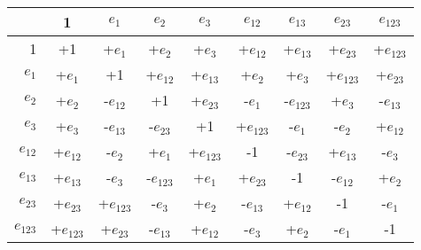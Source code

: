 
\begin{tabular}{|r||c|c|c|c|c|c|c|c|}
\hline
 &
1 & $e_{1}$ & $e_{2}$ & $e_{3}$ & $e_{12}$ & $e_{13}$ & $e_{23}$ & $e_{123}$\\
\hline
\hline
1 & +1 & +$e_{1}$ & +$e_{2}$ & +$e_{3}$ & +$e_{12}$ & +$e_{13}$ & +$e_{23}$ & +$e_{123}$\\
\hline
$e_{1}$ & +$e_{1}$ & +1 & +$e_{12}$ & +$e_{13}$ & +$e_{2}$ & +$e_{3}$ & +$e_{123}$ & +$e_{23}$\\
\hline
$e_{2}$ & +$e_{2}$ & -$e_{12}$ & +1 & +$e_{23}$ & -$e_{1}$ & -$e_{123}$ & +$e_{3}$ & -$e_{13}$\\
\hline
$e_{3}$ & +$e_{3}$ & -$e_{13}$ & -$e_{23}$ & +1 & +$e_{123}$ & -$e_{1}$ & -$e_{2}$ & +$e_{12}$\\
\hline
$e_{12}$ & +$e_{12}$ & -$e_{2}$ & +$e_{1}$ & +$e_{123}$ & -1 & -$e_{23}$ & +$e_{13}$ & -$e_{3}$\\
\hline
$e_{13}$ & +$e_{13}$ & -$e_{3}$ & -$e_{123}$ & +$e_{1}$ & +$e_{23}$ & -1 & -$e_{12}$ & +$e_{2}$\\
\hline
$e_{23}$ & +$e_{23}$ & +$e_{123}$ & -$e_{3}$ & +$e_{2}$ & -$e_{13}$ & +$e_{12}$ & -1 & -$e_{1}$\\
\hline
$e_{123}$ & +$e_{123}$ & +$e_{23}$ & -$e_{13}$ & +$e_{12}$ & -$e_{3}$ & +$e_{2}$ & -$e_{1}$ & -1
\\
\hline
\end{tabular}

